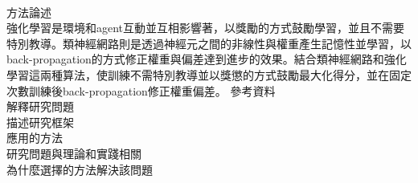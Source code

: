 \begin{flushleft}
{\large {}}\\
\end{flushleft}

方法論述\\
強化學習是環境和agent互動並互相影響著，以獎勵的方式鼓勵學習，並且不需要特別教導。類神經網路則是透過神經元之間的非線性與權重產生記憶性並學習，以back-propagation的方式修正權重與偏差達到進步的效果。結合類神經網路和強化學習這兩種算法，使訓練不需特別教導並以獎懲的方式鼓勵最大化得分，並在固定次數訓練後back-propagation修正權重偏差。
參考資料\\

解釋研究問題\\

描述研究框架\\

應用的方法\\

研究問題與理論和實踐相關\\

為什麼選擇的方法解決該問題\\

